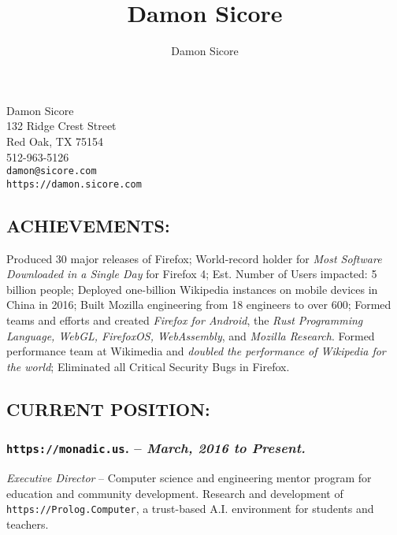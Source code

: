 \documentclass[10pt]{report}
\author{Damon Sicore}
\title{Damon Sicore}
\begin{document}
\begin{center}
\LARGE Damon Sicore \\
\normalsize
132 Ridge Crest Street \\
Red Oak, TX 75154 \\
512-963-5126\\
\texttt{damon@sicore.com}\\
\texttt{https://damon.sicore.com}\\
\end{center}


\subsection*{ACHIEVEMENTS:}  Produced 30 major releases of Firefox; World-record
holder for \emph{Most Software Downloaded in a Single Day} for Firefox 4; Est.
Number of Users impacted: 5 billion people;  Deployed one-billion Wikipedia
instances on mobile devices in China in 2016; Built Mozilla engineering from 18
engineers to over 600;  Formed teams and efforts and created \emph{Firefox for
Android}, the \emph{Rust Programming Language, WebGL, FirefoxOS, WebAssembly},
and \emph{Mozilla Research}.  Formed performance team at Wikimedia and
\emph{doubled the performance of Wikipedia for the world}; Eliminated all
Critical Security Bugs in Firefox.

\subsection*{CURRENT POSITION:}

\subsubsection*{\texttt{https://monadic.us}. -- \emph{March, 2016 to Present. }}
\emph{Executive Director} -- Computer science and engineering mentor program for
education and community development.  Research and development of
\texttt{https://Prolog.Computer}, a trust-based A.I. environment for students
and teachers.
\end{document}
